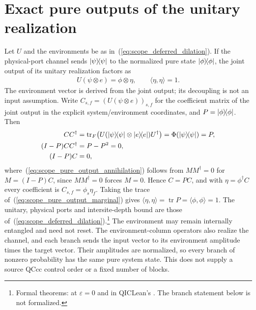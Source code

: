 \documentclass{article}
\begin{document}
\section{Exact pure outputs of the unitary realization}
Let $U$ and the environments be as in~(\ref{eq:scope_deferred_dilation}).
If the physical-port channel sends $|\psi\rangle\!\langle \psi|$ to the normalized
pure state $|\phi\rangle\!\langle \phi|$, the joint output of its unitary
realization factors as
\begin{align}
    U(\psi\otimes e)=\phi\otimes\eta,
    \qquad \langle\eta,\eta\rangle=1.
    \label{eq:scope_pure_output_product}
\end{align}
The environment vector is derived from the joint output; its decoupling
is not an input assumption. Write $C_{s,f}=(U(\psi\otimes e))_{s,f}$
for the coefficient matrix of the joint output in the explicit
system/environment coordinates, and $P=|\phi\rangle\!\langle \phi|$. Then
\begin{align}
    CC^\dagger & =\operatorname{tr}_F\bigl(U(|\psi\rangle\!\langle \psi|\otimes|e\rangle\!\langle e|)U^\dagger\bigr)
    =\Phi(|\psi\rangle\!\langle \psi|)=P,
    \label{eq:scope_pure_output_marginal} \\
    (I-P)CC^\dagger & =P-P^2=0,
    \notag \\
    (I-P)C & =0,
    \label{eq:scope_pure_output_annihilation}
\end{align}
where~(\ref{eq:scope_pure_output_annihilation}) follows from $MM^\dagger=0$
for $M=(I-P)C$, since $MM^\dagger=0$ forces $M=0$. Hence $C=PC$, and with
$\eta=\phi^\dagger C$ every coefficient is $C_{s,f}=\phi_s\eta_f$. Taking
the trace of~(\ref{eq:scope_pure_output_marginal}) gives
$\langle\eta,\eta\rangle=\operatorname{tr}P=\langle\phi,\phi\rangle=1$.
The unitary, physical ports and intersite-depth bound are those
of~(\ref{eq:scope_deferred_dilation}).\footnote{Formal theorems:
     at
    $\varepsilon=0$ and 
    in QICLean's . The branch
    statement below is not formalized.}
The environment may remain internally entangled and need not reset.
The environment-column operators also realize the channel, and each
branch sends the input vector to its environment amplitude times the target
vector. Their amplitudes are normalized, so every branch of nonzero probability
has the same pure system state. This does not supply a source QCcc control
order or a fixed number of blocks.
\end{document}

